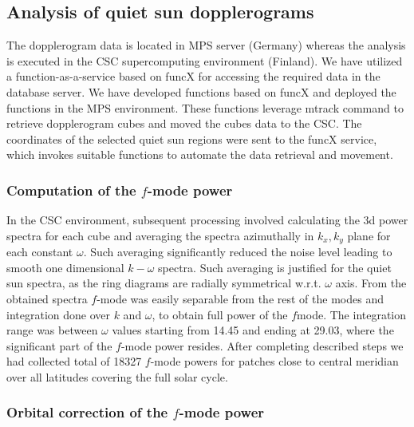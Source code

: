 \documentclass{aa}
\begin{document}
\subsection{Analysis of quiet sun dopplerograms}
The dopplerogram data is located in MPS server (Germany) whereas the analysis is executed in the CSC supercomputing environment (Finland). We have utilized  a function-as-a-service based on funcX \cite[]{chard20funcx}  for accessing the required data in the database server. We have developed functions based on funcX and deployed the functions in the MPS environment. These functions leverage mtrack command to retrieve dopplerogram cubes and moved the cubes data to the CSC. The coordinates of the selected quiet sun regions were sent to the funcX service, which invokes suitable functions to automate the data retrieval and movement.

\subsubsection*{Computation of the $f$-mode power}

In the CSC environment, subsequent processing involved calculating the 3d power spectra for each cube and averaging the spectra azimuthally in $k_x, k_y$ plane for each constant $\omega$. Such averaging significantly reduced the noise level leading to smooth one dimensional $k-\omega$ spectra. Such averaging is justified for the quiet sun spectra, as the ring diagrams are radially symmetrical w.r.t. $\omega$ axis. From the obtained spectra $f$-mode was easily separable from the rest of the modes and integration done over $k$ and $\omega$, to obtain full power of the $f$mode. The integration range was between $\omega$ values starting from 14.45 and ending at 29.03, where the significant part of the $f$-mode power resides. After completing described steps we had collected total of 18327 $f$-mode powers for patches close to central meridian over all latitudes covering the full solar cycle.

\subsubsection*{Orbital correction of the $f$-mode power}
\end{document}
